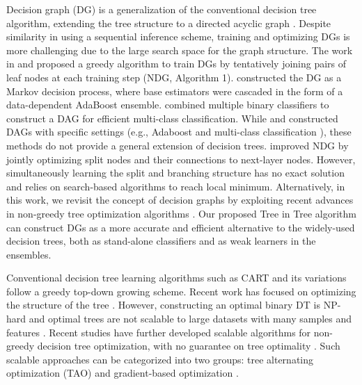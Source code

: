 \documentclass{article}
\begin{document}
Decision graph (DG) is a generalization of the conventional decision tree algorithm, extending the tree structure to a directed acyclic graph \cite{oliver1992decision, sudo2018efficient}. Despite similarity in using a sequential inference scheme, training and optimizing DGs is more challenging due to the large search space for the graph structure. The work in \cite{oliver1992decision} and \cite{Zighed2007} proposed a greedy algorithm to train DGs by tentatively joining pairs of leaf nodes at each training step (NDG, Algorithm 1).  \cite{benbouzid2012fast} constructed the DG as a Markov decision process, where base estimators were cascaded in the form of a data-dependent AdaBoost ensemble. \cite{platt1999large} combined multiple binary classifiers to construct a DAG for efficient multi-class classification. 
While \cite{benbouzid2012fast} and \cite{platt1999large} constructed DAGs with specific settings (e.g., Adaboost  \cite{benbouzid2012fast} and multi-class classification \cite{platt1999large}), these methods do not provide a general extension of decision trees. \cite{shotton2013decision} improved NDG by jointly optimizing  split nodes and their connections to  next-layer nodes. However, simultaneously learning the split and branching structure has no exact solution and relies on search-based algorithms to reach local minimum. 
Alternatively, in this work, we revisit the concept of decision graphs by exploiting recent advances in non-greedy tree optimization algorithms \cite{carreira2018alternating, norouzi2015efficient, hazimeh2020tree, lin2020generalized}. Our proposed Tree in Tree algorithm can construct DGs as a more accurate and efficient alternative to the widely-used decision trees, both as stand-alone classifiers and as weak learners in the ensembles.

Conventional decision tree learning algorithms such as CART \cite{steinberg2009cart} and its variations follow a greedy top-down growing scheme. Recent work has focused on optimizing the structure of the tree  \cite{lin2020generalized, zhu2020scalable, hu2019optimal}. However, constructing an optimal binary DT is NP-hard \cite{laurent1976constructing} and optimal trees are not scalable to large datasets with many samples and features \cite{lin2020generalized, zhu2020scalable, hu2019optimal}. Recent studies have further developed scalable algorithms for non-greedy decision tree optimization, with no guarantee on tree optimality \cite{carreira2018alternating,norouzi2015efficient,zharmagambetov2020smaller,zhu2020resot,kontschieder2015deep,hazimeh2020tree}. Such scalable approaches can be categorized into two groups: tree alternating optimization (TAO) \cite{carreira2018alternating,zharmagambetov2020smaller} and gradient-based optimization \cite{norouzi2015efficient, zhu2020resot,kontschieder2015deep,hazimeh2020tree}.
\end{document}
